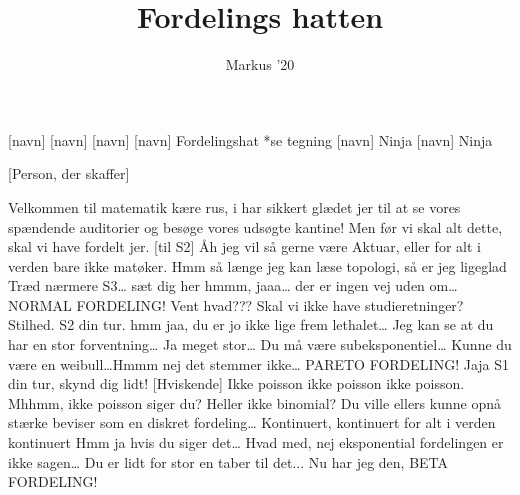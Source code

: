 \documentclass[a4paper,11pt]{article}
\title{Fordelings hatten}
\author{Markus '20}
\begin{document}
\maketitle

\begin{roles}
[navn]
[navn] 
[navn]
[navn] Fordelingshat *se tegning
[navn] Ninja
[navn] Ninja
\end{roles}

\begin{props}
[Person, der skaffer]
\end{props}


\begin{sketch}
 Velkommen til matematik kære rus, i har sikkert glædet jer til at se vores spændende auditorier og besøge vores udsøgte kantine! Men før vi skal alt dette, skal vi have fordelt jer.
[til S2] Åh jeg vil så gerne være Aktuar, eller for alt i verden bare ikke matøker.
 Hmm så længe jeg kan læse topologi, så er jeg ligeglad
 Træd nærmere S3… sæt dig her
 hmmm, jaaa… der er ingen vej uden om… NORMAL FORDELING!
 Vent hvad??? Skal vi ikke have studieretninger?
 Stilhed. S2 din tur.
 hmm jaa, du er jo ikke lige frem lethalet… 
 Jeg kan se at du har en stor forventning… Ja meget stor… Du må være subeksponentiel… Kunne du være en weibull…Hmmm nej det stemmer ikke… PARETO FORDELING!
 Jaja S1 din tur, skynd dig lidt!
[Hviskende] Ikke poisson ikke poisson ikke poisson.
 Mhhmm, ikke poisson siger du? Heller ikke binomial? Du ville ellers kunne opnå stærke beviser som en diskret fordeling…
 Kontinuert, kontinuert for alt i verden kontinuert
 Hmm ja hvis du siger det… Hvad med, nej eksponential fordelingen er ikke sagen… Du er lidt for stor en taber til det... Nu har jeg den, BETA FORDELING!

\end{sketch}
\end{document}
